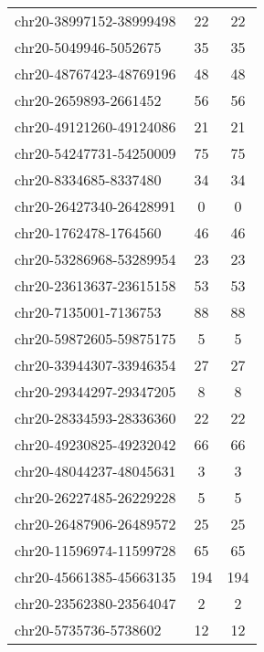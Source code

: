 \begin{longtable}{lSS}
	chr20-38997152-38999498 & 22   & 22                              \\
	chr20-5049946-5052675   & 35   & 35                              \\
	chr20-48767423-48769196 & 48   & 48                              \\
	chr20-2659893-2661452   & 56   & 56                              \\
	chr20-49121260-49124086 & 21   & 21                              \\
	chr20-54247731-54250009 & 75   & 75                              \\
	chr20-8334685-8337480   & 34   & 34                              \\
	chr20-26427340-26428991 & 0    & 0                               \\
	chr20-1762478-1764560   & 46   & 46                              \\
	chr20-53286968-53289954 & 23   & 23                              \\
	chr20-23613637-23615158 & 53   & 53                              \\
	chr20-7135001-7136753   & 88   & 88                              \\
	chr20-59872605-59875175 & 5    & 5                               \\
	chr20-33944307-33946354 & 27   & 27                              \\
	chr20-29344297-29347205 & 8    & 8                               \\
	chr20-28334593-28336360 & 22   & 22                              \\
	chr20-49230825-49232042 & 66   & 66                              \\
	chr20-48044237-48045631 & 3    & 3                               \\
	chr20-26227485-26229228 & 5    & 5                               \\
	chr20-26487906-26489572 & 25   & 25                              \\
	chr20-11596974-11599728 & 65   & 65                              \\
	chr20-45661385-45663135 & 194  & 194                             \\
	chr20-23562380-23564047 & 2    & 2                               \\
	chr20-5735736-5738602   & 12   & 12                              \\

\end{longtable}
